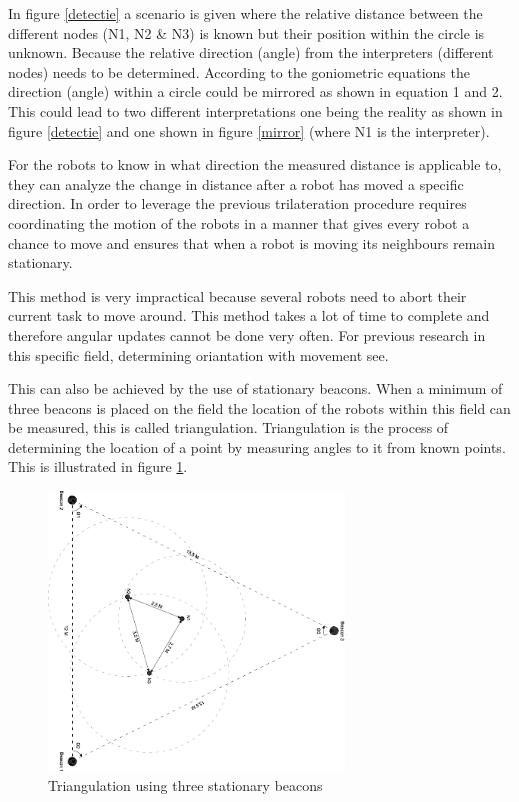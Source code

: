 \documentclass[10pt,a4paper]{article}
\begin{document}
In figure \ref{detectie} a scenario is given where the relative distance between the different nodes (N1, N2 \& N3) is known but their position within the circle is unknown. Because the relative direction (angle) from the interpreters (different nodes) needs to be determined. According to the goniometric equations the direction (angle) within a circle could be mirrored as shown in equation 1 and 2. This could lead to two different interpretations one being the reality as shown in figure \ref{detectie} and one shown in figure \ref{mirror} (where N1 is the interpreter). 


For the robots to know in what direction the measured distance is applicable to, they can analyze the change in distance after a robot has moved a specific direction. In order to leverage the previous trilateration procedure requires coordinating the motion of the robots in a manner that gives every robot a chance to move and ensures that when a robot is moving its neighbours remain stationary. \cite{Angle}

This method is very impractical because several robots need to abort their current task to move around. This method takes a lot of time to complete and therefore angular updates cannot be done very often. For previous research in this specific field, determining oriantation with movement see.\cite{delft}

This can also be achieved by the use of stationary beacons. When a minimum of three beacons is placed on the field the location of the robots within this field can be measured, this is called triangulation. Triangulation is the process of determining the location of a point by measuring angles to it from known points. This is illustrated in figure \ref{driehoek}.

\begin{figure}[H]
\centering
\includegraphics[angle=90,width=0.7\textwidth]{driehoek.pdf}
\caption{Triangulation using three stationary beacons}
\label{driehoek}
\end{figure}
\end{document}
